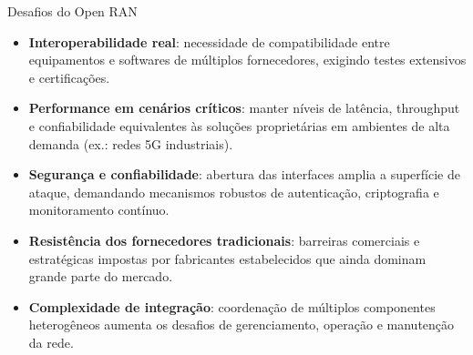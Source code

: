 \begin{frame}{Desafios do Open RAN}
\small
\begin{itemize}
  \item \textbf{Interoperabilidade real}: necessidade de compatibilidade entre equipamentos e softwares de múltiplos fornecedores, exigindo testes extensivos e certificações.
  \item \textbf{Performance em cenários críticos}: manter níveis de latência, throughput e confiabilidade equivalentes às soluções proprietárias em ambientes de alta demanda (ex.: redes 5G industriais).
  \item \textbf{Segurança e confiabilidade}: abertura das interfaces amplia a superfície de ataque, demandando mecanismos robustos de autenticação, criptografia e monitoramento contínuo.
  \item \textbf{Resistência dos fornecedores tradicionais}: barreiras comerciais e estratégicas impostas por fabricantes estabelecidos que ainda dominam grande parte do mercado.
  \item \textbf{Complexidade de integração}: coordenação de múltiplos componentes heterogêneos aumenta os desafios de gerenciamento, operação e manutenção da rede.
\end{itemize}
\end{frame}